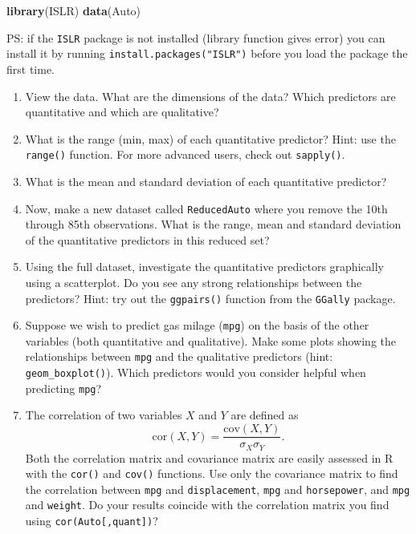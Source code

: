 \documentclass[]{article}
\newenvironment{Shaded}{\begin{snugshade}}{\end{snugshade}}
\newcommand{\KeywordTok}[1]{\textcolor[rgb]{0.13,0.29,0.53}{\textbf{#1}}}
\newcommand{\NormalTok}[1]{#1}
\begin{document}
\begin{Shaded}
\begin{Highlighting}[]
\KeywordTok{library}\NormalTok{(ISLR)}
\KeywordTok{data}\NormalTok{(Auto)}
\end{Highlighting}
\end{Shaded}

PS: if the \texttt{ISLR} package is not installed (library function
gives error) you can install it by running
\texttt{install.packages("ISLR")} before you load the package the first
time.

\begin{enumerate}
\def\labelenumi{\alph{enumi})}
\item
  View the data. What are the dimensions of the data? Which predictors
  are quantitative and which are qualitative?
\item
  What is the range (min, max) of each quantitative predictor? Hint: use
  the \texttt{range()} function. For more advanced users, check out
  \texttt{sapply()}.
\item
  What is the mean and standard deviation of each quantitative
  predictor?
\item
  Now, make a new dataset called \texttt{ReducedAuto} where you remove
  the 10th through 85th observations. What is the range, mean and
  standard deviation of the quantitative predictors in this reduced set?
\item
  Using the full dataset, investigate the quantitative predictors
  graphically using a scatterplot. Do you see any strong relationships
  between the predictors? Hint: try out the \texttt{ggpairs()} function
  from the \texttt{GGally} package.
\item
  Suppose we wish to predict gas milage (\texttt{mpg}) on the basis of
  the other variables (both quantitative and qualitative). Make some
  plots showing the relationships between \texttt{mpg} and the
  qualitative predictors (hint: \texttt{geom\_boxplot()}). Which
  predictors would you consider helpful when predicting \texttt{mpg}?
\item
  The correlation of two variables \(X\) and \(Y\) are defined as
  \[ \text{cor}(X,Y) = \frac{\text{cov}(X,Y)}{\sigma_X\sigma_Y}.\] Both
  the correlation matrix and covariance matrix are easily assessed in R
  with the \texttt{cor()} and \texttt{cov()} functions. Use only the
  covariance matrix to find the correlation between \texttt{mpg} and
  \texttt{displacement}, \texttt{mpg} and \texttt{horsepower}, and
  \texttt{mpg} and \texttt{weight}. Do your results coincide with the
  correlation matrix you find using \texttt{cor(Auto{[},quant{]})}?
\end{enumerate}
\end{document}

